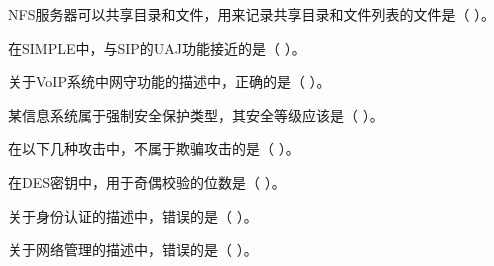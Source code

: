 \begin{qitems}[startnum=41]
\begin{bbox}
\qitem NFS服务器可以共享目录和文件，用来记录共享目录和文件列表的文件是（ ）。\par
{}
\end{bbox}

\begin{bbox}
\qitem 在SIMPLE中，与SIP的UAJ功能接近的是（ ）。\par
{}
\end{bbox}

\begin{bbox}
\qitem 关于VoIP系统中网守功能的描述中，正确的是（ ）。\par
{}
\end{bbox}

\begin{bbox}
\qitem 某信息系统属于强制安全保护类型，其安全等级应该是（ ）。\par
{}
\end{bbox}

\begin{bbox}
\qitem 在以下几种攻击中，不属于欺骗攻击的是（ ）。\par
{}
\end{bbox}

\begin{bbox}
\qitem 在DES密钥中，用于奇偶校验的位数是（ ）。\par
{}
\end{bbox}

\begin{bbox}
\qitem 关于身份认证的描述中，错误的是（ ）。\par
{}
\end{bbox}

\begin{bbox}
\qitem 关于网络管理的描述中，错误的是（ ）。\par
{}
\end{bbox}

\end{qitems}

